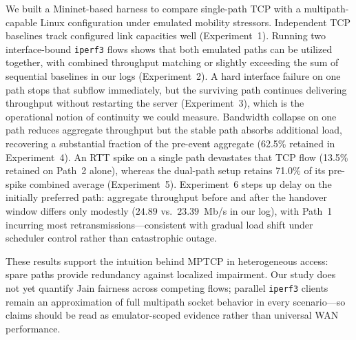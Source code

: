 \label{sec:conclusion}

We built a Mininet-based harness to compare single-path TCP with a multipath-capable Linux configuration under emulated mobility stressors. Independent TCP baselines track configured link capacities well (Experiment~1). Running two interface-bound \texttt{iperf3} flows shows that both emulated paths can be utilized together, with combined throughput matching or slightly exceeding the sum of sequential baselines in our logs (Experiment~2). A hard interface failure on one path stops that subflow immediately, but the surviving path continues delivering throughput without restarting the server (Experiment~3), which is the operational notion of continuity we could measure. Bandwidth collapse on one path reduces aggregate throughput but the stable path absorbs additional load, recovering a substantial fraction of the pre-event aggregate (62.5\% retained in Experiment~4). An RTT spike on a single path devastates that TCP flow (13.5\% retained on Path~2 alone), whereas the dual-path setup retains 71.0\% of its pre-spike combined average (Experiment~5). Experiment~6 steps up delay on the initially preferred path: aggregate throughput before and after the handover window differs only modestly ($24.89$ vs.\ $23.39$~Mb/s in our log), with Path~1 incurring most retransmissions---consistent with gradual load shift under scheduler control rather than catastrophic outage.

These results support the intuition behind MPTCP in heterogeneous access: spare paths provide redundancy against localized impairment. Our study does not yet quantify Jain fairness across competing flows; parallel \texttt{iperf3} clients remain an approximation of full multipath socket behavior in every scenario---so claims should be read as emulator-scoped evidence rather than universal WAN performance.
